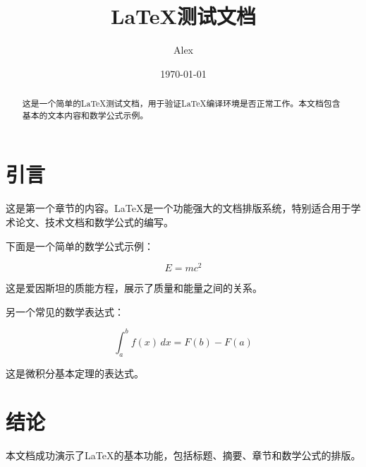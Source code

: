 \documentclass[12pt,a4paper]{article}
\title{LaTeX测试文档}
\author{Alex}
\date{\today}
\begin{document}
\maketitle

\begin{abstract}
这是一个简单的LaTeX测试文档，用于验证LaTeX编译环境是否正常工作。本文档包含基本的文本内容和数学公式示例。
\end{abstract}

\section{引言}

这是第一个章节的内容。LaTeX是一个功能强大的文档排版系统，特别适合用于学术论文、技术文档和数学公式的编写。

下面是一个简单的数学公式示例：

\begin{equation}
E = mc^2
\end{equation}

这是爱因斯坦的质能方程，展示了质量和能量之间的关系。

另一个常见的数学表达式：

\begin{equation}
\int_{a}^{b} f(x) \, dx = F(b) - F(a)
\end{equation}

这是微积分基本定理的表达式。

\section{结论}

本文档成功演示了LaTeX的基本功能，包括标题、摘要、章节和数学公式的排版。
\end{document}
